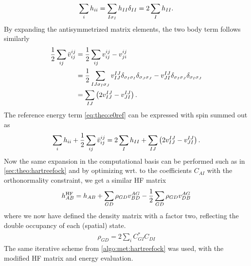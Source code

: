 \begin{align*}
    \sum_i h_{ii} = \sum_{I\sigma_I} h_{II}\delta_{II} = 2\sum_I h_{II}.
\end{align*}
By expanding the antisymmetrized matrix elements, the two body term follows similarly
\begin{align*}
    \frac{1}{2}\sum_{ij} \bar{v}^{ij}_{ij} &= \frac{1}{2}\sum_{ij} v^{ij}_{ij} - v^{ij}_{ji} \\
    &= \frac{1}{2}\sum_{IJ\sigma_I \sigma_J} v^{IJ}_{IJ}\delta_{\sigma_I \sigma_I}\delta_{\sigma_J \sigma_J} - v^{IJ}_{JI}\delta_{\sigma_I \sigma_J}\delta_{\sigma_I \sigma_J} \\
    &= \sum_{IJ} \left(2v^{IJ}_{IJ} -  v^{IJ}_{JI}\right).
\end{align*}
The reference energy term \cref{eq:theo:e0ref} can be expressed with spin summed out as
\begin{align*}
    \sum_i h_{ii} + \frac{1}{2}\sum_{ij} \bar{v}^{ij}_{ij} = 2\sum_I h_{II} + \sum_{IJ} \left(2v^{IJ}_{IJ}-v^{IJ}_{JI}\right).
\end{align*}
Now the same expansion in the computational basis can be performed such as in \cref{sec:theo:hartreefock} and by optimizing wrt. to the coefficients $C_{AI}$ with the orthonormality constraint, we get a similar HF matrix
\begin{align*}
    h^{\text{HF}}_{AB} = h_{AB} + \sum_{G D} \rho_{GD} v^{A G}_{B D} - \frac{1}{2}\sum_{G D} \rho_{GD}v^{AG}_{DB}
\end{align*}
where we now have defined the density matrix with a factor two, reflecting the double occupancy of each (spatial) state.
\begin{align*}
    \rho_{GD} = 2\sum_i C^*_{G I} C_{D I}
\end{align*}
The same iterative scheme from \cref{algo:met:hartreefock} was used, with the modified HF matrix and energy evaluation.

